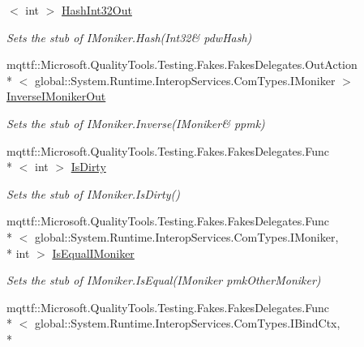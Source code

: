 \begin{DoxyCompactItemize}
$<$ int $>$ \hyperlink{class_system_1_1_runtime_1_1_interop_services_1_1_com_types_1_1_fakes_1_1_stub_i_moniker_abd0ad8f52ef8b970f1947a7218482675}{Hash\-Int32\-Out}
\begin{DoxyCompactList}\small\item\em Sets the stub of I\-Moniker.\-Hash(Int32\& pdw\-Hash)\end{DoxyCompactList}\item 
mqttf\-::\-Microsoft.\-Quality\-Tools.\-Testing.\-Fakes.\-Fakes\-Delegates.\-Out\-Action\\*
$<$ global\-::\-System.\-Runtime.\-Interop\-Services.\-Com\-Types.\-I\-Moniker $>$ \hyperlink{class_system_1_1_runtime_1_1_interop_services_1_1_com_types_1_1_fakes_1_1_stub_i_moniker_a11f3c17dae79f09d9024e707bec1a5cf}{Inverse\-I\-Moniker\-Out}
\begin{DoxyCompactList}\small\item\em Sets the stub of I\-Moniker.\-Inverse(I\-Moniker\& ppmk)\end{DoxyCompactList}\item 
mqttf\-::\-Microsoft.\-Quality\-Tools.\-Testing.\-Fakes.\-Fakes\-Delegates.\-Func\\*
$<$ int $>$ \hyperlink{class_system_1_1_runtime_1_1_interop_services_1_1_com_types_1_1_fakes_1_1_stub_i_moniker_a6f2e7dc4b7e331a74b628d0aa9d2b588}{Is\-Dirty}
\begin{DoxyCompactList}\small\item\em Sets the stub of I\-Moniker.\-Is\-Dirty()\end{DoxyCompactList}\item 
mqttf\-::\-Microsoft.\-Quality\-Tools.\-Testing.\-Fakes.\-Fakes\-Delegates.\-Func\\*
$<$ global\-::\-System.\-Runtime.\-Interop\-Services.\-Com\-Types.\-I\-Moniker, \\*
int $>$ \hyperlink{class_system_1_1_runtime_1_1_interop_services_1_1_com_types_1_1_fakes_1_1_stub_i_moniker_af7402221bbe9767abeeab8ab78fb8f2a}{Is\-Equal\-I\-Moniker}
\begin{DoxyCompactList}\small\item\em Sets the stub of I\-Moniker.\-Is\-Equal(\-I\-Moniker pmk\-Other\-Moniker)\end{DoxyCompactList}\item 
mqttf\-::\-Microsoft.\-Quality\-Tools.\-Testing.\-Fakes.\-Fakes\-Delegates.\-Func\\*
$<$ global\-::\-System.\-Runtime.\-Interop\-Services.\-Com\-Types.\-I\-Bind\-Ctx, \\*

\end{DoxyCompactItemize}
